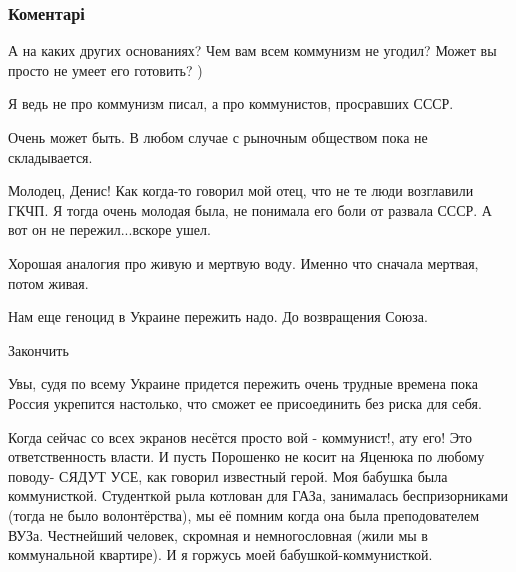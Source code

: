  
 
 
 
 
\subsubsection{Коментарі}
\label{sec:27_12_2015.fb.zharkih_denis.1.sssr_stalin.cmt}

\begin{itemize} %
А на каких других основаниях? Чем вам всем коммунизм не угодил? Может вы просто не умеет его готовить? )

\begin{itemize} %
Я ведь не про коммунизм писал, а про коммунистов, просравших СССР.
\end{itemize} %

Очень может быть. В любом случае с рыночным обществом пока не складывается.


Молодец, Денис! Как когда-то говорил мой отец, что не те люди возглавили ГКЧП.
Я тогда очень молодая была, не понимала его боли от развала СССР. А вот он не
пережил...вскоре ушел.


Хорошая аналогия про живую и мертвую воду. Именно что сначала мертвая, потом живая.

Нам еще геноцид в Украине пережить надо. До возвращения Союза.

\begin{itemize} %
Закончить
\end{itemize} %


Увы, судя по всему Украине придется пережить очень трудные времена пока Россия
укрепится настолько, что сможет ее присоединить без риска для себя.



Когда сейчас со всех экранов несётся просто вой - коммунист!, ату его! Это
ответственность власти. И пусть Порошенко не косит на Яценюка по любому поводу-
СЯДУТ УСЕ, как говорил известный герой. Моя бабушка была коммунисткой. Студенткой
рыла котлован для ГАЗа, занималась беспризорниками (тогда не было
волонтёрства), мы её помним когда она была преподователем ВУЗа. Честнейший
человек, скромная и немногословная (жили мы в коммунальной квартире). И я горжусь
моей бабушкой-коммунисткой.


\end{itemize}
